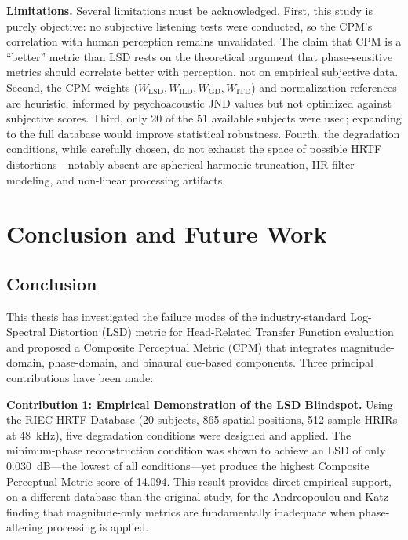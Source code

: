 \documentclass[12pt,a4paper]{article}
\begin{document}
\textbf{Limitations.}
Several limitations must be acknowledged. First, this study is purely objective: no subjective listening tests were conducted, so the CPM's correlation with human perception remains unvalidated. The claim that CPM is a ``better'' metric than LSD rests on the theoretical argument that phase-sensitive metrics should correlate better with perception, not on empirical subjective data. Second, the CPM weights ($W_{\mathrm{LSD}}, W_{\mathrm{ILD}}, W_{\mathrm{GD}}, W_{\mathrm{ITD}}$) and normalization references are heuristic, informed by psychoacoustic JND values but not optimized against subjective scores. Third, only 20 of the 51 available subjects were used; expanding to the full database would improve statistical robustness. Fourth, the degradation conditions, while carefully chosen, do not exhaust the space of possible HRTF distortions---notably absent are spherical harmonic truncation, IIR filter modeling, and non-linear processing artifacts.



\newpage
\section{Conclusion and Future Work}

\subsection{Conclusion}

This thesis has investigated the failure modes of the industry-standard Log-Spectral Distortion (LSD) metric for Head-Related Transfer Function evaluation and proposed a Composite Perceptual Metric (CPM) that integrates magnitude-domain, phase-domain, and binaural cue-based components. Three principal contributions have been made:

\textbf{Contribution 1: Empirical Demonstration of the LSD Blindspot.}
Using the RIEC HRTF Database (20 subjects, 865 spatial positions, 512-sample HRIRs at 48~kHz), five degradation conditions were designed and applied. The minimum-phase reconstruction condition was shown to achieve an LSD of only 0.030~dB---the lowest of all conditions---yet produce the highest Composite Perceptual Metric score of 14.094. This result provides direct empirical support, on a different database than the original study, for the Andreopoulou and Katz \cite{andreopoulou2022} finding that magnitude-only metrics are fundamentally inadequate when phase-altering processing is applied.
\end{document}
